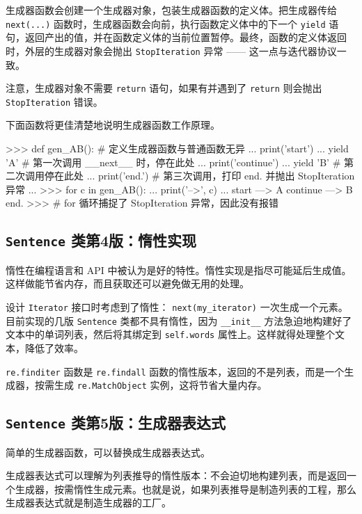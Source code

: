 生成器函数会创建一个生成器对象，包装生成器函数的定义体。把生成器传给 \texttt{next(...)} 函数时，生成器函数会向前，执行函数定义体中的下一个 \texttt{yield} 语句，返回产出的值，并在函数定义体的当前位置暂停。最终，函数的定义体返回时，外层的生成器对象会抛出 \texttt{StopIteration} 异常 —— 这一点与迭代器协议一致。

注意，生成器对象不需要 \texttt{return} 语句，如果有并遇到了 \texttt{return} 则会抛出 \texttt{StopIteration} 错误。

下面函数将更佳清楚地说明生成器函数工作原理。

\begin{python}
>>> def gen_AB():       # 定义生成器函数与普通函数无异
...     print('start')
...     yield 'A'           # 第一次调用 __next__ 时，停在此处
...     print('continue')
...     yield 'B'           # 第二次调用停在此处
...     print('end.')       # 第三次调用，打印 end. 并抛出 StopIteration 异常
... 
>>> for c in gen_AB():
...     print('-->', c)
... 
start 
---> A 
continue 
---> B 
end. 
>>>         # for 循环捕捉了 StopIteration 异常，因此没有报错
\end{python}
 
\subsection{\texttt{Sentence} 类第4版：惰性实现}

惰性在编程语言和 API 中被认为是好的特性。惰性实现是指尽可能延后生成值。这样做能节省内存，而且获取还可以避免做无用的处理。

设计 \texttt{Iterator} 接口时考虑到了惰性： \texttt{next(my\_iterator)} 一次生成一个元素。目前实现的几版 \texttt{Sentence} 类都不具有惰性，因为 \texttt{\_\_init\_\_} 方法急迫地构建好了文本中的单词列表，然后将其绑定到 \texttt{self.words} 属性上。这样就得处理整个文本，降低了效率。

\texttt{re.finditer} 函数是 \texttt{re.findall} 函数的惰性版本，返回的不是列表，而是一个生成器，按需生成 \texttt{re.MatchObject} 实例，这将节省大量内存。



\subsection{\texttt{Sentence} 类第5版：生成器表达式}

简单的生成器函数，可以替换成生成器表达式。

生成器表达式可以理解为列表推导的惰性版本：不会迫切地构建列表，而是返回一个生成器，按需惰性生成元素。也就是说，如果列表推导是制造列表的工程，那么生成器表达式就是制造生成器的工厂。

